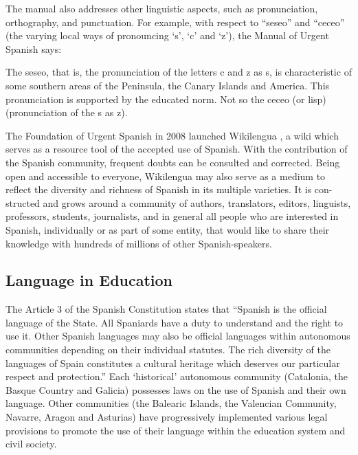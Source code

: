 \begin{multicols}{2}
The manual also addresses other linguistic aspects, such as pronunciation, orthography, and punctuation. For example, with respect to “seseo” and “ceceo” (the varying local ways of pronouncing ‘s’, ‘c’ and ‘z’), the Manual of Urgent Spanish says:

The seseo, that is, the pronunciation of the letters c and z as s, is characteristic of some southern areas of the Peninsula, the Canary Islands and America. This pronunciation is supported by the educated norm. Not so the ceceo (or lisp) (pronunciation of the s as z).

The Foundation of Urgent Spanish in 2008 launched Wikilengua \cite{wikilengua}, a wiki which serves as a resource tool of the accepted use of Spanish. With the contribution of the Spanish community, frequent doubts can be consulted and corrected. Being open and accessible to everyone, Wikilengua may also serve as a medium to reflect the diversity and richness of Spanish in its multiple varieties. It is con-structed and grows around a community of authors, translators, editors, linguists, professors, students, journalists, and in general all people who are interested in Spanish, individually or as part of some entity, that would like to share their knowledge with hundreds of millions of other Spanish-speakers.

\subsection{Language in Education}


The Article 3 of the Spanish Constitution states that “Spanish is the official language of the State. All Spaniards have a duty to understand and the right to use it. Other Spanish languages may also be official languages within autonomous communities depending on their individual statutes. The rich diversity of the languages of Spain constitutes a cultural heritage which deserves our particular respect and protection.” Each ‘historical’ autonomous community (Catalonia, the Basque Country and Galicia) possesses laws on the use of Spanish and their own language. Other communities (the Balearic Islands, the Valencian Community, Navarre, Aragon and Asturias) have progressively implemented various legal provisions to promote the use of their language within the education system and civil society.


\end{multicols}
